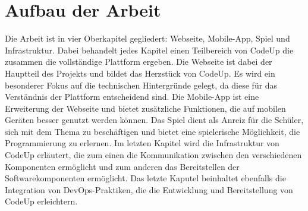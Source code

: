 \documentclass[main.tex]{subfiles}
\begin{document}
    \section{Aufbau der Arbeit}
    Die Arbeit ist in vier Oberkapitel gegliedert: Webseite, Mobile-App, Spiel und Infrastruktur.
    Dabei behandelt jedes Kapitel einen Teilbereich von CodeUp die zusammen die vollständige Plattform ergeben.
    Die Webseite ist dabei der Hauptteil des Projekts und bildet das Herzstück von CodeUp.
    Es wird ein besonderer Fokus auf die technischen Hintergründe gelegt, da diese für das Verständnis der Plattform entscheidend sind.
    Die Mobile-App ist eine Erweiterung der Webseite und bietet zusätzliche Funktionen, die auf mobilen Geräten besser genutzt werden können.
    Das Spiel dient als Anreiz für die Schüler, sich mit dem Thema zu beschäftigen und bietet eine spielerische Möglichkeit, die Programmierung zu erlernen.
    Im letzten Kapitel wird die Infrastruktur von CodeUp erläutert, die zum einen die Kommunikation zwischen den verschiedenen Komponenten ermöglicht und zum anderen das Bereitstellen der Softwarekomponenten ermöglicht.
    Das letzte Kaputel beinhaltet ebenfalls die Integration von DevOps-Praktiken, die die Entwicklung und Bereitstellung von CodeUp erleichtern.
\end{document}
